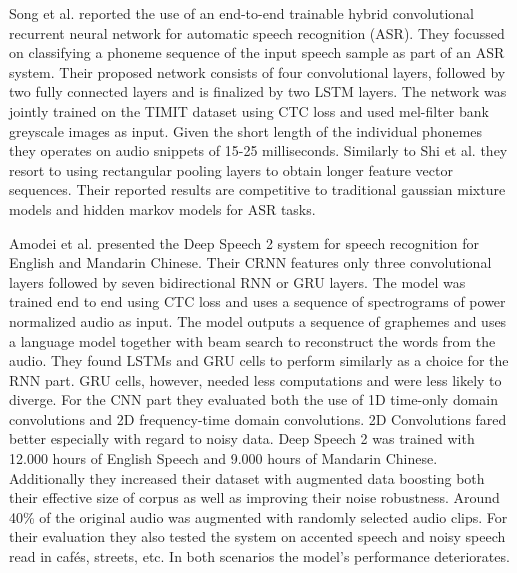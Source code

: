 Song et al.\cite{song2015end} reported the use of an end-to-end trainable hybrid convolutional recurrent neural network for automatic speech recognition (ASR). They focussed on classifying a phoneme sequence of the input speech sample as part of an ASR system. Their proposed network consists of four convolutional layers, followed by two fully connected layers and is finalized by two LSTM layers. The network was jointly trained on the TIMIT dataset using CTC loss and used mel-filter bank greyscale images as input. Given the short length of the individual phonemes they operates on audio snippets of 15-25 milliseconds. Similarly to Shi et al.\cite{shi2016end} they resort to using rectangular pooling layers to obtain longer feature vector sequences. Their reported results are competitive to traditional gaussian mixture models and hidden markov models for ASR tasks. 

Amodei et al. presented the Deep Speech 2 system for speech recognition for English and Mandarin Chinese. Their CRNN features only three convolutional layers followed by seven bidirectional RNN or GRU layers. The model was trained end to end using CTC loss and uses a sequence of spectrograms of power normalized audio as input. The model outputs a sequence of graphemes and uses a language model together with beam search to reconstruct the words from the audio. They found LSTMs and GRU cells to perform similarly as a choice for the RNN part. GRU cells, however, needed less computations and were less likely to diverge. For the CNN part they evaluated both the use of 1D time-only domain convolutions and 2D frequency-time domain convolutions. 2D Convolutions fared better especially with regard to noisy data. 
Deep Speech 2 was trained with 12.000 hours of English Speech and 9.000 hours of Mandarin Chinese. Additionally they increased their dataset with augmented data boosting both their effective size of corpus as well as improving their noise robustness. Around 40\% of the original audio was augmented with randomly selected audio clips. For their evaluation they also tested the system on accented speech and noisy speech read in cafés, streets, etc. In both scenarios the model's performance deteriorates.

